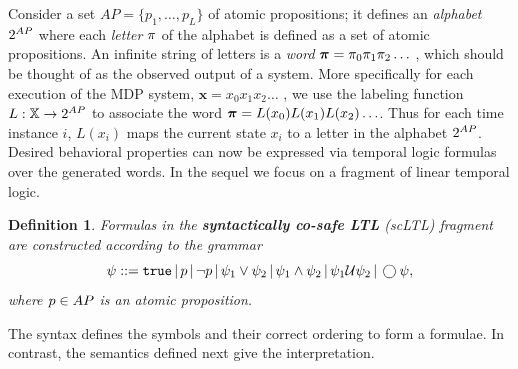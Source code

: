 \documentclass[conference]{IEEEtran}
\newtheorem{definition}{Definition}
\newcommand{\red}[1]{{\color{red} #1 }}
\newcommand{\sofieNew}[1]{{\color{blue}#1}}
\begin{document}
Consider a set $AP = \{ p_1, \ldots, p_L \}$ of atomic propositions; it defines an \emph{alphabet} ${2^{AP}}$ where each \emph{letter} $\pi$ of the alphabet is defined as a set of atomic propositions. An infinite string of letters is a \emph{word} $\boldsymbol{\pi}=\pi_0\pi_1\pi_2\ldots$%
, which should be thought of as the observed output of a system. 
\sofieNew{More specifically for each execution of the MDP system,  $\mathbf{x} = x_0 x_1 x_2 \ldots$ , we use the }
labeling function $L: \mathbb{X} \rightarrow {2^{AP}}$ to 
associate the word $\boldsymbol{\pi} = L(x_0)L(x_1) L(x_2) \ldots$. Thus for each time instance $i$, $L(x_i)$ maps the current state $x_i$ to a letter in the alphabet ${2^{AP}}$.
\sofieNew{Desired behavioral properties can now be expressed via temporal logic formulas over the generated words.}
In the sequel we focus on a fragment of linear temporal logic. 
\begin{definition}
  \label{def:gdtl-syntax}
  Formulas in the \textbf{syntactically co-safe LTL} (scLTL) fragment are constructed according to the grammar
  \begin{equation}
    \label{eq:scLTL}
    \psi ::=  \True \, |\,p \, |\, \lnot p \, |\, \psi_1 \vee\psi_2  \, |\, \psi_1 \land \psi_2 \, |\, \psi_1 \ltluntil \psi_2 \, |\, \ltlnext \psi, 
  \end{equation}
  where $p\in AP$ is an atomic proposition.
\end{definition}
The syntax defines the symbols and their correct ordering to form a formulae. In contrast, the semantics defined next give the interpretation.
\end{document}
